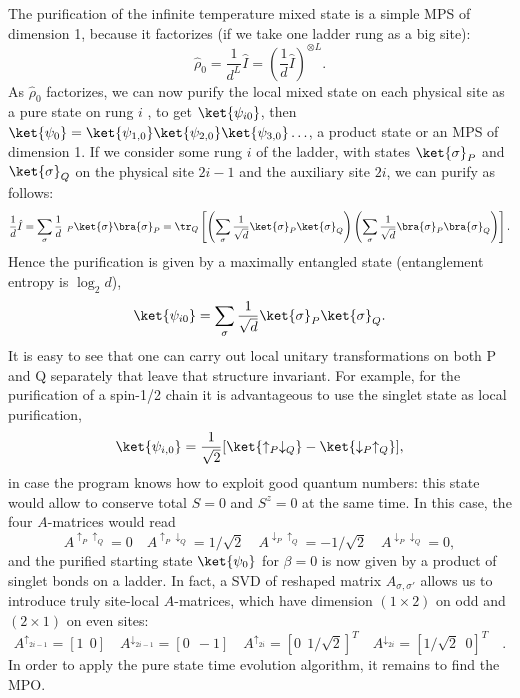 The purification of the infinite temperature mixed state is a simple MPS of dimension 1, because it factorizes (if we take one ladder rung as a big site):
\begin{equation}
\hat{\rho}_0 = \frac{1}{d^L} \hat{I} = \left(\frac{1}{d} \hat{I}\right)^{\otimes L} .
\end{equation}
As $\hat{\rho}_0$ factorizes, we can now purify the local mixed state on each physical site as a pure state on rung $i$ , to get $\ket{\psi_{i0}}$, then 
$\ket{\psi_0} = \ket{\psi_{1,0}}\ket{\psi_{2,0}}\ket{\psi_{3,0}} \ldots$, a product state or an MPS of dimension 1. If we consider some rung $i$ of the ladder, with states $\ket{\sigma}_P$ and $\ket{\sigma}_Q$ on the physical site $2i-1$ and the auxiliary site $2i$, we can purify as follows:
\begin{equation}
\frac{1}{d} \hat{I} = \sum_{\sigma} \frac{1}{d} \phantom\langle_P\ket{\sigma}\bra{\sigma}_P = \tr_Q \left[ \left( \sum_{\sigma} \frac{1}{\sqrt{d}} \ket{\sigma}_P \ket{\sigma}_Q \right) \left( \sum_{\sigma} \frac{1}{\sqrt{d}} \bra{\sigma}_P \bra{\sigma}_Q  \right) \right] .
\end{equation}
Hence the purification is given by a maximally entangled state (entanglement entropy is $\log_2 d$),
\begin{equation}
\ket{\psi_{i0}} = \sum_{\sigma} \frac{1}{\sqrt{d}} \ket{\sigma}_P \ket{\sigma}_Q .
\end{equation}
It is easy to see that one can carry out local unitary transformations on both P and Q separately that leave that structure invariant. For example, for the purification of a spin-1/2 chain it is  advantageous to use the singlet state as local purification,
\begin{equation}
\ket{\psi_{i,0}} = \frac{1}{\sqrt{2}} [ \ket{\uparrow_P\downarrow_Q} - \ket{\downarrow_P\uparrow_Q} ],
\end{equation}
in case the program knows how to exploit good quantum numbers: this state would allow to conserve total $S=0$ and $S^z=0$ at the same time. In this case, the four $A$-matrices would read
\begin{equation}
A^{\uparrow_P\uparrow_Q} =0 \quad 
A^{\uparrow_P\downarrow_Q} =1/\sqrt{2} \quad 
A^{\downarrow_P\uparrow_Q} =-1/\sqrt{2} \quad 
A^{\downarrow_P\downarrow_Q} =0  ,
\end{equation}
and the purified starting state $\ket{\psi_0}$ for $\beta=0$ is now given by a product of singlet bonds on a ladder. In fact, a SVD of reshaped matrix $A_{\sigma,\sigma'}$ allows us to introduce truly site-local $A$-matrices, which have dimension $(1\times 2)$ on odd and $(2\times 1)$ on even sites:
\begin{equation}
A^{\uparrow_{2i-1}} = [ 1\ \ 0] \quad
A^{\downarrow_{2i-1}} = [ 0\ \ -1] \quad
A^{\uparrow_{2i}} = [ 0\ \ 1/\sqrt{2}]^T \quad
A^{\downarrow_{2i}} = [ 1/\sqrt{2} \ \ 0]^T \quad .
\end{equation}
In order to apply the pure state time evolution algorithm, it remains to find the MPO.
 
